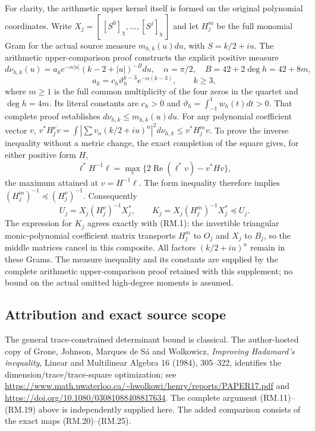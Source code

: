 For clarity, the arithmetic upper kernel itself is formed on the original
polynomial coordinates. Write $X_j=[\,[S^0]_\chi,\ldots,[S^j]_\chi\,]$
and let $H_j^m$ be the full monomial Gram for the actual source measure
$m_{h,k}(u)du$, with $S=k/2+iu$. The arithmetic upper-comparison proof
constructs the explicit positive measure
\[
 d\nu_{h,k}(u)=a_k e^{-\alpha|u|}(k-2+|u|)^{-B}du,
 \quad \alpha=\pi/2,\quad B=42+2\deg h=42+8m,
\]
\[
 a_k=c_h\vartheta_h^{k-3}e^{-\alpha(k-3)},\qquad k\ge3,
\]
where $m\ge1$ is the full common multiplicity of the four zeros in the
quartet and $\deg h=4m$. Its literal constants are $c_h>0$ and
$\vartheta_h=\int_{-1}^1w_h(t)dt>0$. That complete proof establishes
$d\nu_{h,k}\le m_{h,k}(u)du$.
For any polynomial coefficient vector $v$,
$v^*H_j^\nu v=\int|\sum v_n(k/2+iu)^n|^2d\nu_{h,k}
\le v^*H_j^m v$. To prove the inverse inequality without a metric change,
the exact completion of the square gives, for either positive form $H$,
\[
 \ell^*H^{-1}\ell=\max_v\{2\operatorname{Re}(\ell^*v)-v^*Hv\},
\]
the maximum attained at $v=H^{-1}\ell$. The form inequality therefore
implies $(H_j^m)^{-1}\preceq(H_j^\nu)^{-1}$. Consequently
\begin{equation}
 U_j=X_j(H_j^\nu)^{-1}X_j^*,\qquad
 K_j=X_j(H_j^m)^{-1}X_j^*\preceq U_j.\tag{RM.35}
\end{equation}
The expression for $K_j$ agrees exactly with (RM.1): the invertible
triangular monic-polynomial coefficient matrix transports $H_j^m$ to
$O_j$ and $X_j$ to $B_j$, so the middle matrices cancel in this composite.
All factors $(k/2+iu)^n$ remain in these Grams. The measure inequality and
its constants are supplied by the complete arithmetic upper-comparison
proof retained with this supplement; no bound on the actual omitted
high-degree moments is assumed.

\subsection{Attribution and exact source scope}
The general trace-constrained determinant bound is classical. The author-hosted
copy of Grone, Johnson, Marques de S\'a and Wolkowicz,
\emph{Improving Hadamard's inequality}, Linear and Multilinear Algebra
16 (1984), 305--322, identifies the dimension/trace/trace-square optimization;
see \url{https://www.math.uwaterloo.ca/~hwolkowi/henry/reports/PAPER17.pdf}
and \url{https://doi.org/10.1080/03081088408817634}.
The complete argument (RM.11)--(RM.19) above is independently supplied here.
The added comparison consists of the exact maps (RM.20)--(RM.25).

